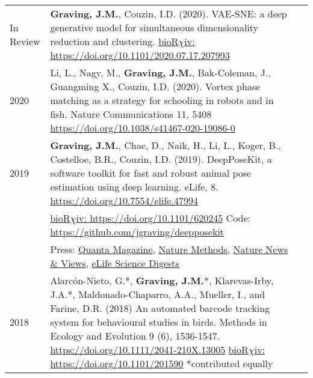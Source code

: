 \documentclass[letterpaper,10pt,oneside]{article}
\begin{document}
\begin{small}
\begin{longtable}{@{} l p{5.3in}l}
\large{In Review}
& \textbf{Graving, J.M.}, Couzin, I.D. (2020).  VAE-SNE: a deep generative model for simultaneous dimensionality reduction and clustering. \vspace{1mm} \href{https://doi.org/10.1101/2020.07.17.207993}{bioR$\chi$iv: https://doi.org/10.1101/2020.07.17.207993} \\
\large{2020}
& Li, L., Nagy, M., \textbf{Graving, J.M.}, Bak-Coleman, J., Guangming X., Couzin, I.D. (2020). Vortex phase matching as a strategy for schooling in robots and in fish. Nature Communications 11, 5408 \href{https://doi.org/10.1038/s41467-020-19086-0 }{https://doi.org/10.1038/s41467-020-19086-0} \vspace{1mm} \\
\large{2019}
 &\textbf{Graving, J.M.}, Chae, D., Naik, H., Li, L., Koger, B., Costelloe, B.R., Couzin, I.D. (2019). DeepPoseKit, a software toolkit for fast and robust animal pose estimation using deep learning. eLife, 8. \href{https://doi.org/10.7554/elife.47994}{https://doi.org/10.7554/elife.47994}\\ &\href{https://doi.org/10.1101/620245}{bioR$\chi$iv: https://doi.org/10.1101/620245} Code: \href{https://github.com/jgraving/deepposekit}{ https://github.com/jgraving/deepposekit} \\
 &Press: \href{https://www.quantamagazine.org/to-decode-the-brain-scientists-automate-the-study-of-behavior-20191210/}{Quanta Magazine}, 
 \href{https://doi.org/10.1038/s41592-019-0678-2}{Nature Methods},
 \href{https://doi.org/10.1038/d41586-019-02942-5}{Nature News \& Views},
 \href{https://elifesciences.org/digests/47994/machine-learning-animal-poses-to-understand-behavior}{eLife Science Digests}
 \vspace{1mm} \\
\large{2018}
& Alarc\'{o}n-Nieto, G.*, \textbf{Graving, J.M.}*, Klarevas-Irby, J.A.*, Maldonado-Chaparro, A.A., Mueller, I., and Farine, D.R. (2018) An automated barcode tracking system for behavioural studies in birds. Methods in Ecology and Evolution 9 (6), 1536-1547. \href{https://doi.org/10.1111/2041-210X.13005}{https://doi.org/10.1111/2041-210X.13005} \href{https://doi.org/10.1101/201590}{bioR$\chi$iv: https://doi.org/10.1101/201590}  \small{*contributed equally}  \vspace{1mm} \\

\end{longtable}
\end{small}
\end{document}
